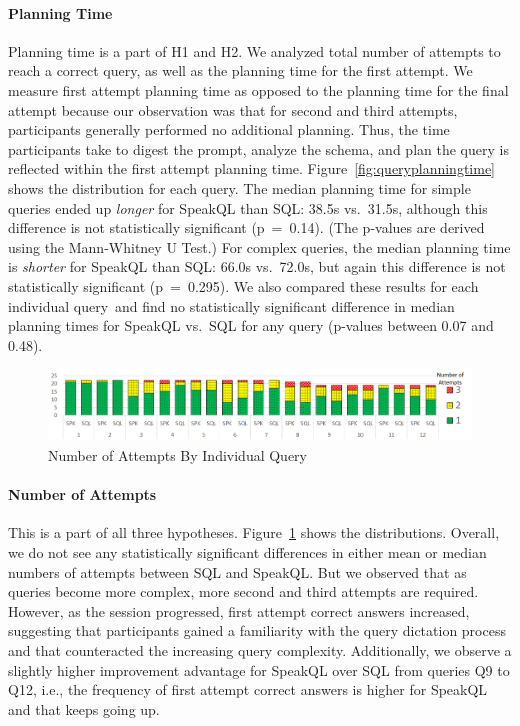 \paragraph{\textbf{Planning Time}} 
Planning time is a part of H1 and H2. 
We analyzed total number of attempts to reach a correct query, as well as the planning time for the first attempt. 
We measure first attempt planning time as opposed to the planning time for the final attempt because our observation was that for second and third attempts, participants generally performed no additional planning.
Thus, the time participants take to digest the prompt, analyze the schema, and plan the query is reflected within the first attempt planning time. 
Figure~\ref{fig:queryplanningtime} shows the distribution for each query. 
The median planning time for simple queries ended up \textit{longer} for SpeakQL than SQL: 38.5s vs.~31.5s, although this difference is not statistically significant (p~=~0.14). (The p-values are derived using the Mann-Whitney U Test.) 
For complex queries, the median planning time is \textit{shorter} for SpeakQL than SQL: 66.0s vs.~72.0s, but again this difference is not statistically significant (p~=~0.295). 
We also compared these results for each individual query and find no statistically significant difference in median planning times for SpeakQL vs.~SQL for any query (p-values between 0.07 and 0.48). 

\begin{figure}[t]
  \centering
  \includegraphics[width=\linewidth]{figures/query-attemptnum-histplot-excel.png}
  \caption{Number of Attempts By Individual Query}
  \label{fig:queryattemptnum}
\end{figure}

\paragraph{\textbf{Number of Attempts}}
This is a part of all three hypotheses. 
Figure~\ref{fig:queryattemptnum} shows the distributions. 
Overall, we do not see any statistically significant differences in either mean or median numbers of attempts between SQL and SpeakQL. 
But we observed that as queries become more complex, more second and third attempts are required. 
However, as the session progressed, first attempt correct answers increased, suggesting that participants gained a familiarity with the query dictation process and that counteracted the increasing query complexity. 
Additionally, we observe a slightly higher improvement advantage for SpeakQL over SQL from queries Q9 to Q12, i.e., the frequency of first attempt correct answers is higher for SpeakQL and that keeps going up.



